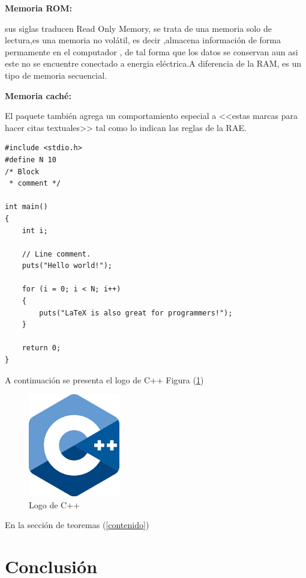 \documentclass{article}
\begin{document}
\textbf{Memoria ROM:}

sus siglas traducen Read Only Memory, se trata de una memoria solo de lectura,es una memoria no volátil, es decir ,almacena información de forma permamente en el
computador , de tal forma que los datos se conservan aun asi este no se encuentre conectado a energia eléctrica.A diferencia de la RAM, es un tipo de memoria secuencial.  

\textbf{Memoria caché:}

El paquete también agrega un comportamiento especial 
a <<estas marcas para hacer citas textuales>> tal como 
lo indican las reglas de la RAE. \cite{dirac}
\cite{knuthwebsite}

\begin{lstlisting}
#include <stdio.h>
#define N 10
/* Block
 * comment */

int main()
{
    int i;

    // Line comment.
    puts("Hello world!");
    
    for (i = 0; i < N; i++)
    {
        puts("LaTeX is also great for programmers!");
    }

    return 0;
}
\end{lstlisting}

A continuación se presenta el logo de C++ Figura (\ref{fig:cpplogo})

\begin{figure}[h]
\includegraphics[width=4cm]{cpplogo.png}
\centering
\caption{Logo de C++}
\label{fig:cpplogo}
\end{figure}

En la sección de teoremas (\ref{contenido})

\section{Conclusión} \label{conclulsion}



\end{document}
